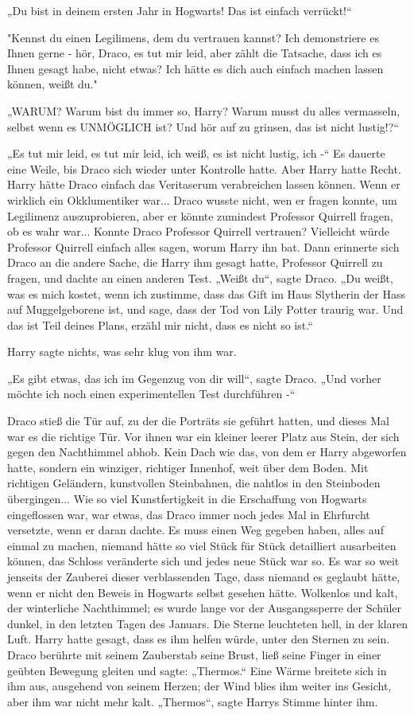{„Du bist in deinem ersten Jahr in Hogwarts! Das ist einfach verrückt!“

"Kennst du einen Legilimens, dem du vertrauen kannst? Ich demonstriere es Ihnen gerne - hör, Draco, es tut mir leid, aber zählt die Tatsache, dass ich es Ihnen gesagt habe, nicht etwas? Ich hätte es dich auch einfach machen lassen können, weißt du."

„WARUM? Warum bist du immer so, Harry? Warum musst du alles vermasseln, selbst wenn es UNMÖGLICH ist? Und hör auf zu grinsen, das ist nicht lustig!?“

„Es tut mir leid, es tut mir leid, ich weiß, es ist nicht lustig, ich -“ Es dauerte eine Weile, bis Draco sich wieder unter Kontrolle hatte. Aber Harry hatte Recht. Harry hätte Draco einfach das Veritaserum verabreichen lassen können. Wenn er wirklich ein Okklumentiker war... Draco wusste nicht, wen er fragen konnte, um Legilimenz auszuprobieren, aber er könnte zumindest Professor Quirrell fragen, ob es wahr war... Konnte Draco Professor Quirrell vertrauen? Vielleicht würde Professor Quirrell einfach alles sagen, worum Harry ihn bat. Dann erinnerte sich Draco an die andere Sache, die Harry ihm gesagt hatte, Professor Quirrell zu fragen, und dachte an einen anderen Test. „Weißt du“, sagte Draco. „Du weißt, was es mich kostet, wenn ich zustimme, dass das Gift im Haus Slytherin der Hass auf Muggelgeborene ist, und sage, dass der Tod von Lily Potter traurig war. Und das ist Teil deines Plans, erzähl mir nicht, dass es nicht so ist.“

Harry sagte nichts, was sehr klug von ihm war.

„Es gibt etwas, das ich im Gegenzug von dir will“, sagte Draco. „Und vorher möchte ich noch einen experimentellen Test durchführen -“

Draco stieß die Tür auf, zu der die Porträts sie geführt hatten, und dieses Mal war es die richtige Tür. Vor ihnen war ein kleiner leerer Platz aus Stein, der sich gegen den Nachthimmel abhob. Kein Dach wie das, von dem er Harry abgeworfen hatte, sondern ein winziger, richtiger Innenhof, weit über dem Boden. Mit richtigen Geländern, kunstvollen Steinbahnen, die nahtlos in den Steinboden übergingen... Wie so viel Kunstfertigkeit in die Erschaffung von Hogwarts eingeflossen war, war etwas, das Draco immer noch jedes Mal in Ehrfurcht versetzte, wenn er daran dachte. Es muss einen Weg gegeben haben, alles auf einmal zu machen, niemand hätte so viel Stück für Stück detailliert ausarbeiten können, das Schloss veränderte sich und jedes neue Stück war so. Es war so weit jenseits der Zauberei dieser verblassenden Tage, dass niemand es geglaubt hätte, wenn er nicht den Beweis in Hogwarts selbst gesehen hätte. Wolkenlos und kalt, der winterliche Nachthimmel; es wurde lange vor der Ausgangssperre der Schüler dunkel, in den letzten Tagen des Januars. Die Sterne leuchteten hell, in der klaren Luft. Harry hatte gesagt, dass es ihm helfen würde, unter den Sternen zu sein. Draco berührte mit seinem Zauberstab seine Brust, ließ seine Finger in einer geübten Bewegung gleiten und sagte: „Thermos.“ Eine Wärme breitete sich in ihm aus, ausgehend von seinem Herzen; der Wind blies ihm weiter ins Gesicht, aber ihm war nicht mehr kalt. „Thermos“, sagte Harrys Stimme hinter ihm.

}
